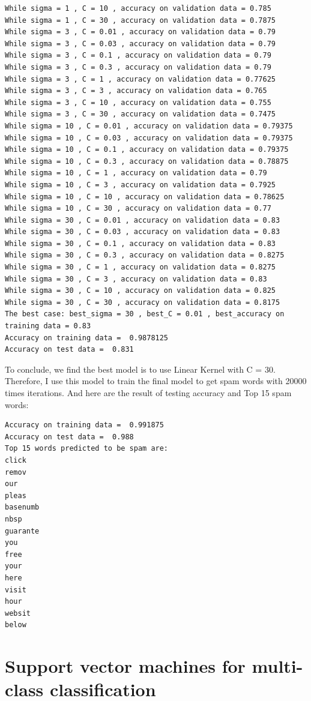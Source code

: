 \documentclass[paper=a4, fontsize=11pt]{scrartcl} %
\numberwithin{equation}{section} %
\numberwithin{figure}{section} %
\numberwithin{table}{section} %
\begin{document}
\begin{verbatim}
While sigma = 1 , C = 10 , accuracy on validation data = 0.785
While sigma = 1 , C = 30 , accuracy on validation data = 0.7875
While sigma = 3 , C = 0.01 , accuracy on validation data = 0.79
While sigma = 3 , C = 0.03 , accuracy on validation data = 0.79
While sigma = 3 , C = 0.1 , accuracy on validation data = 0.79
While sigma = 3 , C = 0.3 , accuracy on validation data = 0.79
While sigma = 3 , C = 1 , accuracy on validation data = 0.77625
While sigma = 3 , C = 3 , accuracy on validation data = 0.765
While sigma = 3 , C = 10 , accuracy on validation data = 0.755
While sigma = 3 , C = 30 , accuracy on validation data = 0.7475
While sigma = 10 , C = 0.01 , accuracy on validation data = 0.79375
While sigma = 10 , C = 0.03 , accuracy on validation data = 0.79375
While sigma = 10 , C = 0.1 , accuracy on validation data = 0.79375
While sigma = 10 , C = 0.3 , accuracy on validation data = 0.78875
While sigma = 10 , C = 1 , accuracy on validation data = 0.79
While sigma = 10 , C = 3 , accuracy on validation data = 0.7925
While sigma = 10 , C = 10 , accuracy on validation data = 0.78625
While sigma = 10 , C = 30 , accuracy on validation data = 0.77
While sigma = 30 , C = 0.01 , accuracy on validation data = 0.83
While sigma = 30 , C = 0.03 , accuracy on validation data = 0.83
While sigma = 30 , C = 0.1 , accuracy on validation data = 0.83
While sigma = 30 , C = 0.3 , accuracy on validation data = 0.8275
While sigma = 30 , C = 1 , accuracy on validation data = 0.8275
While sigma = 30 , C = 3 , accuracy on validation data = 0.83
While sigma = 30 , C = 10 , accuracy on validation data = 0.825
While sigma = 30 , C = 30 , accuracy on validation data = 0.8175
The best case: best_sigma = 30 , best_C = 0.01 , best_accuracy on training data = 0.83
Accuracy on training data =  0.9878125
Accuracy on test data =  0.831
\end{verbatim}
To conclude, we find the best model is to use Linear Kernel with C = 30. Therefore, I use this model to train the final model to get spam words with 20000 times iterations. And here are the result of testing accuracy and Top 15 spam words:
\begin{verbatim}
Accuracy on training data =  0.991875
Accuracy on test data =  0.988
Top 15 words predicted to be spam are:
click
remov
our
pleas
basenumb
nbsp
guarante
you
free
your
here
visit
hour
websit
below
\end{verbatim}


\section{Support vector machines for multi-class classification}
\end{document}
